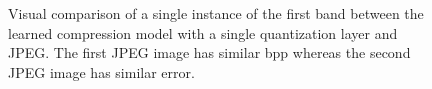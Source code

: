 \documentclass[runningheads]{llncs}
\begin{document}
\begin{figure}
\begin{tabular}{ccc}
\end{tabular}
\caption{Visual comparison of a single instance of the first band between the learned compression model with a single 
quantization layer and JPEG. The first JPEG image has similar bpp whereas the second JPEG image has similar error.}
\label{fig-comp1}
\end{figure}

\end{document}

